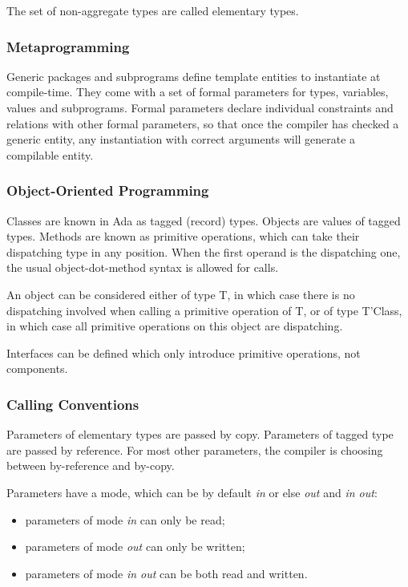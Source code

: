 \documentclass{article}
\begin{document}
The set of non-aggregate types are called elementary types.

\subsubsection{Metaprogramming}

Generic packages and subprograms define template entities to instantiate at
compile-time. They come with a set of formal parameters for types, variables,
values and subprograms. Formal parameters declare individual constraints and
relations with other formal parameters, so that once the compiler has checked a
generic entity, any instantiation with correct arguments will generate a
compilable entity.

\subsubsection{Object-Oriented Programming}

Classes are known in Ada as tagged (record) types. Objects are values of tagged
types. Methods are known as primitive operations, which can take their
dispatching type in any position. When the first operand is the dispatching
one, the usual object-dot-method syntax is allowed for calls.

An object can be considered either of type T, in which case there is no
dispatching involved when calling a primitive operation of T, or of type
T'Class, in which case all primitive operations on this object are dispatching.

Interfaces can be defined which only introduce primitive operations, not
components.

\subsubsection{Calling Conventions}

Parameters of elementary types are passed by copy.  Parameters of tagged type
are passed by reference. For most other parameters, the compiler is choosing
between by-reference and by-copy.

Parameters have a mode, which can be by default \emph{in} or else \emph{out}
and \emph{in out}:
\begin{itemize}
\item parameters of mode \emph{in} can only be read;
\item parameters of mode \emph{out} can only be written;
\item parameters of mode \emph{in out} can be both read and written.
\end{itemize}
\end{document}
